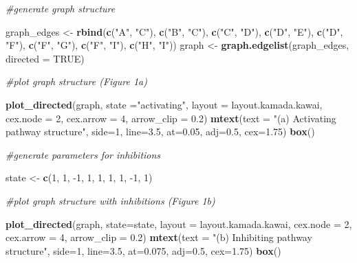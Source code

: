 \documentclass[]{article}
\newenvironment{Shaded}{\begin{snugshade}}{\end{snugshade}}
\newcommand{\CommentTok}[1]{\textcolor[rgb]{0.56,0.35,0.01}{\textit{#1}}}
\newcommand{\DataTypeTok}[1]{\textcolor[rgb]{0.13,0.29,0.53}{#1}}
\newcommand{\DecValTok}[1]{\textcolor[rgb]{0.00,0.00,0.81}{#1}}
\newcommand{\FloatTok}[1]{\textcolor[rgb]{0.00,0.00,0.81}{#1}}
\newcommand{\KeywordTok}[1]{\textcolor[rgb]{0.13,0.29,0.53}{\textbf{#1}}}
\newcommand{\NormalTok}[1]{#1}
\newcommand{\OtherTok}[1]{\textcolor[rgb]{0.56,0.35,0.01}{#1}}
\newcommand{\StringTok}[1]{\textcolor[rgb]{0.31,0.60,0.02}{#1}}
\begin{document}
\begin{Shaded}
\begin{Highlighting}[]
\CommentTok{#generate graph structure}

\NormalTok{graph_edges <-}\StringTok{ }\KeywordTok{rbind}\NormalTok{(}\KeywordTok{c}\NormalTok{(}\StringTok{"A"}\NormalTok{, }\StringTok{"C"}\NormalTok{), }\KeywordTok{c}\NormalTok{(}\StringTok{"B"}\NormalTok{, }\StringTok{"C"}\NormalTok{), }\KeywordTok{c}\NormalTok{(}\StringTok{"C"}\NormalTok{, }\StringTok{"D"}\NormalTok{), }\KeywordTok{c}\NormalTok{(}\StringTok{"D"}\NormalTok{, }\StringTok{"E"}\NormalTok{),}
                     \KeywordTok{c}\NormalTok{(}\StringTok{"D"}\NormalTok{, }\StringTok{"F"}\NormalTok{), }\KeywordTok{c}\NormalTok{(}\StringTok{"F"}\NormalTok{, }\StringTok{"G"}\NormalTok{), }\KeywordTok{c}\NormalTok{(}\StringTok{"F"}\NormalTok{, }\StringTok{"I"}\NormalTok{), }\KeywordTok{c}\NormalTok{(}\StringTok{"H"}\NormalTok{, }\StringTok{"I"}\NormalTok{))}
\NormalTok{graph <-}\StringTok{ }\KeywordTok{graph.edgelist}\NormalTok{(graph_edges, }\DataTypeTok{directed =} \OtherTok{TRUE}\NormalTok{)}

\CommentTok{#plot graph structure (Figure 1a)}

\KeywordTok{plot_directed}\NormalTok{(graph, }\DataTypeTok{state =}\StringTok{"activating"}\NormalTok{, }\DataTypeTok{layout =}\NormalTok{ layout.kamada.kawai,}
              \DataTypeTok{cex.node =} \DecValTok{2}\NormalTok{, }\DataTypeTok{cex.arrow =} \DecValTok{4}\NormalTok{, }\DataTypeTok{arrow_clip =} \FloatTok{0.2}\NormalTok{)}
\KeywordTok{mtext}\NormalTok{(}\DataTypeTok{text =} \StringTok{"(a) Activating pathway structure"}\NormalTok{, }\DataTypeTok{side=}\DecValTok{1}\NormalTok{, }\DataTypeTok{line=}\FloatTok{3.5}\NormalTok{, }\DataTypeTok{at=}\FloatTok{0.05}\NormalTok{, }\DataTypeTok{adj=}\FloatTok{0.5}\NormalTok{, }\DataTypeTok{cex=}\FloatTok{1.75}\NormalTok{)}
\KeywordTok{box}\NormalTok{()}

\CommentTok{#generate parameters for inhibitions}

\NormalTok{state <-}\StringTok{ }\KeywordTok{c}\NormalTok{(}\DecValTok{1}\NormalTok{, }\DecValTok{1}\NormalTok{, }\DecValTok{-1}\NormalTok{, }\DecValTok{1}\NormalTok{, }\DecValTok{1}\NormalTok{, }\DecValTok{1}\NormalTok{, }\DecValTok{1}\NormalTok{, }\DecValTok{-1}\NormalTok{, }\DecValTok{1}\NormalTok{)}

\CommentTok{#plot graph structure with inhibitions (Figure 1b)}

\KeywordTok{plot_directed}\NormalTok{(graph, }\DataTypeTok{state=}\NormalTok{state, }\DataTypeTok{layout =}\NormalTok{ layout.kamada.kawai,}
              \DataTypeTok{cex.node =} \DecValTok{2}\NormalTok{, }\DataTypeTok{cex.arrow =} \DecValTok{4}\NormalTok{, }\DataTypeTok{arrow_clip =} \FloatTok{0.2}\NormalTok{)}
\KeywordTok{mtext}\NormalTok{(}\DataTypeTok{text =} \StringTok{"(b) Inhibiting pathway structure"}\NormalTok{, }\DataTypeTok{side=}\DecValTok{1}\NormalTok{, }\DataTypeTok{line=}\FloatTok{3.5}\NormalTok{, }\DataTypeTok{at=}\FloatTok{0.075}\NormalTok{, }\DataTypeTok{adj=}\FloatTok{0.5}\NormalTok{, }\DataTypeTok{cex=}\FloatTok{1.75}\NormalTok{)}
\KeywordTok{box}\NormalTok{()}
\end{Highlighting}
\end{Shaded}
\end{document}
